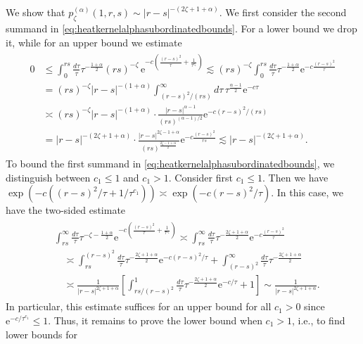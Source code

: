 \documentclass[12pt,reqno,a4paper]{amsart}
\theoremstyle{definition}
\theoremstyle{remark}
\numberwithin{equation}{section}
\newcommand{\1}{\mathbbm{1}}
\newcommand{\me}[1]{\mathrm{e}^{#1}}
\begin{document}
We show that $p_\zeta^{(\alpha)}(1,r,s)\sim |r-s|^{-(2\zeta+1+\alpha)}$.
We first consider the second summand in \eqref{eq:heatkernelalphasubordinatedbounds}. For a lower bound we drop it, while for an upper bound we estimate
\begin{align}
  \label{eq:heatkernelalphasubordinatedboundsaux6}
  \begin{split}
    0 & \leq \int_{0}^{rs} \frac{d\tau}{\tau} \tau^{-\frac{1+\alpha}{2}} (rs)^{-\zeta}\, \me{-c(\frac{(r-s)^2}{\tau}+\frac{1}{\tau^{c_1}})}
    \lesssim (rs)^{-\zeta}\int_0^{rs} \frac{d\tau}{\tau} \tau^{-\frac{1+\alpha}{2}}\me{-c\frac{(r-s)^2}{\tau}} \\
    & = (rs)^{-\zeta} |r-s|^{-(1+\alpha)} \int_{(r-s)^2/(rs)}^\infty d\tau\, \tau^{\frac{\alpha-1}{2}} \me{-c\tau} \\
    & \asymp (rs)^{-\zeta} |r-s|^{-(1+\alpha)} \cdot \frac{|r-s|^{\alpha-1}}{(rs)^{(\alpha-1)/2}}\me{-c(r-s)^2/(rs)} \\
    & = |r-s|^{-(2\zeta+1+\alpha)} \cdot \frac{|r-s|^{2\zeta-1+\alpha}}{(rs)^{\frac{2\zeta-1+\alpha}{2}}}\me{-c\frac{(r-s)^2}{rs}}
    \lesssim |r-s|^{-(2\zeta+1+\alpha)}.
  \end{split}
\end{align}
To bound the first summand in \eqref{eq:heatkernelalphasubordinatedbounds}, we distinguish between $c_1\leq1$ and $c_1>1$. Consider first $c_1\leq1$. Then we have $\exp\left(-c((r-s)^2/\tau+1/\tau^{c_1})\right)\asymp\exp(-c(r-s)^2/\tau)$. In this case, we have the two-sided estimate
\begin{align}
  \label{eq:heatkernelalphasubordinatedboundsaux5}
  \begin{split}
    & \int_{rs}^\infty \frac{d\tau}{\tau} \tau^{-\zeta-\frac{1+\alpha}{2}} \me{-c(\frac{(r-s)^2}{\tau}+\frac{1}{\tau^{c_1}})}
      \asymp \int_{rs}^\infty \frac{d\tau}{\tau} \tau^{-\frac{2\zeta+1+\alpha}{2}} \me{-c\frac{(r-s)^2}{\tau}} \\
    & \quad \asymp \int_{rs}^{(r-s)^2} \frac{d\tau}{\tau} \tau^{-\frac{2\zeta+1+\alpha}{2}} \me{-c(r-s)^2/\tau} + \int_{(r-s)^2}^\infty \frac{d\tau}{\tau} \tau^{-\frac{2\zeta+1+\alpha}{2}} \\
    & \quad \asymp \frac{1}{|r-s|^{2\zeta+1+\alpha}} \left[\int_{rs/(r-s)^2}^1 \frac{d\tau}{\tau}\tau^{-\frac{2\zeta+1+\alpha}{2}}\me{-c/\tau} + 1 \right]
      \sim \frac{1}{|r-s|^{2\zeta+1+\alpha}}.
  \end{split}
\end{align}
In particular, this estimate suffices for an upper bound for all $c_1>0$ since $\me{-c/\tau^{c_1}}\leq1$. Thus, it remains to prove the lower bound when $c_1>1$, i.e., to find lower bounds for
\end{document}
